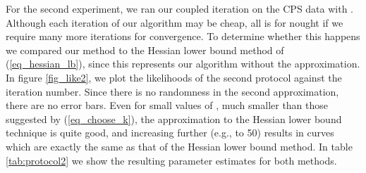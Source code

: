 \documentclass[11pt]{article}
\begin{document}
For the second experiment, we ran our coupled iteration on the CPS data with . Although each iteration of our algorithm may be cheap, all is for nought if we require many more iterations for convergence. To determine whether this happens we compared our method to the Hessian lower bound method of (\ref{eq_hessian_lb}), since this represents our algorithm without the approximation. In figure \ref{fig_like2}, we plot the likelihoods of the second protocol against the iteration number.  Since there is no randomness in the second approximation, there are no error bars.  Even for small values of , much smaller than those suggested by (\ref{eq_choose_k}), the approximation to the Hessian lower bound technique is quite good, and increasing  further (e.g., to 50) results in curves which are exactly the same as that of the Hessian lower bound method.  In table \ref{tab:protocol2} we show the resulting parameter estimates for both methods.
\end{document}
